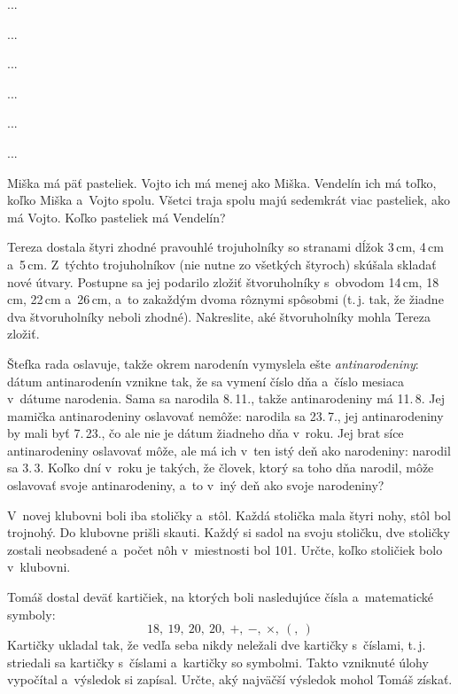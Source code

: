 ﻿{%
...}

{%
...}

{%
...}

{%
...}

{%
...}

{%
...}

{%
Miška má päť pasteliek. Vojto ich má menej ako Miška. Vendelín ich má toľko, koľko Miška a~Vojto spolu. Všetci traja spolu majú sedemkrát viac pasteliek, ako má Vojto. Koľko pasteliek má Vendelín?}

{%
Tereza dostala štyri zhodné pravouhlé trojuholníky so stranami dĺžok 3\,cm, 4\,cm a~5\,cm. Z~týchto trojuholníkov (nie nutne zo všetkých štyroch) skúšala skladať nové útvary. Postupne sa jej podarilo zložiť štvoruholníky s~obvodom 14\,cm, 18\,cm, 22\,cm a~26\,cm, a~to zakaždým dvoma rôznymi spôsobmi (t.\,j. tak, že žiadne dva štvoruholníky neboli zhodné). Nakreslite, aké štvoruholníky mohla Tereza zložiť.}

{%
Štefka rada oslavuje, takže okrem narodenín vymyslela ešte {\it antinarodeniny\/}: dátum antinarodenín vznikne tak, že sa vymení číslo dňa a~číslo mesiaca v~dátume narodenia. Sama sa narodila 8.\,11., takže antinarodeniny má 11.\,8. Jej mamička antinarodeniny oslavovať nemôže: narodila sa 23.\,7., jej antinarodeniny by mali byť 7.\,23., čo ale nie je dátum žiadneho dňa v~roku. Jej brat síce antinarodeniny oslavovať môže, ale má ich v~ten istý deň ako narodeniny: narodil sa 3.\,3. Koľko dní v~roku je takých, že človek, ktorý sa toho dňa narodil, môže oslavovať svoje antinarodeniny, a~to v~iný deň ako svoje narodeniny?}

{%
V~novej klubovni boli iba stoličky a~stôl. Každá stolička mala štyri nohy, stôl bol trojnohý. Do klubovne prišli skauti. Každý si sadol na svoju stoličku, dve stoličky zostali neobsadené a~počet nôh v~miestnosti bol 101. Určte, koľko stoličiek bolo v~klubovni.}

{%
Tomáš dostal deväť kartičiek, na ktorých boli nasledujúce čísla a~matematické symboly:
$$
18,\ 19,\ 20,\ 20,\ +,\ -,\ \times,\ (,\ )
$$
Kartičky ukladal tak, že vedľa seba nikdy neležali dve kartičky s~číslami, t.\,j. striedali sa kartičky s~číslami a~kartičky so symbolmi.
Takto vzniknuté úlohy vypočítal a~výsledok si zapísal. Určte, aký najväčší výsledok mohol Tomáš získať.}

